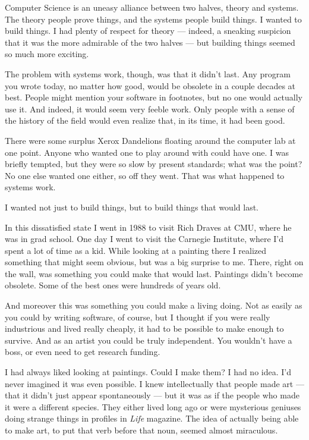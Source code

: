 Computer Science is an uneasy alliance between two halves, theory and
systems. The theory people prove things, and the systems people build
things. I wanted to build things. I had plenty of respect for theory ---
indeed, a sneaking suspicion that it was the more admirable of the two
halves --- but building things seemed so much more exciting.

The problem with systems work, though, was that it didn't last. Any
program you wrote today, no matter how good, would be obsolete in a
couple decades at best. People might mention your software in footnotes,
but no one would actually use it. And indeed, it would seem very feeble
work. Only people with a sense of the history of the field would even
realize that, in its time, it had been good.

There were some surplus Xerox Dandelions floating around the computer
lab at one point. Anyone who wanted one to play around with could have
one. I was briefly tempted, but they were so slow by present standards;
what was the point? No one else wanted one either, so off they went.
That was what happened to systems work.

I wanted not just to build things, but to build things that would last.

In this dissatisfied state I went in 1988 to visit Rich Draves at CMU,
where he was in grad school. One day I went to visit the Carnegie
Institute, where I'd spent a lot of time as a kid. While looking at a
painting there I realized something that might seem obvious, but was a
big surprise to me. There, right on the wall, was something you could
make that would last. Paintings didn't become obsolete. Some of the best
ones were hundreds of years old.

And moreover this was something you could make a living doing. Not as
easily as you could by writing software, of course, but I thought if you
were really industrious and lived really cheaply, it had to be possible
to make enough to survive. And as an artist you could be truly
independent. You wouldn't have a boss, or even need to get research
funding.

I had always liked looking at paintings. Could I make them? I had no
idea. I'd never imagined it was even possible. I knew intellectually
that people made art --- that it didn't just appear spontaneously ---
but it was as if the people who made it were a different species. They
either lived long ago or were mysterious geniuses doing strange things
in profiles in \emph{Life} magazine. The idea of actually being able to
make art, to put that verb before that noun, seemed almost miraculous.


